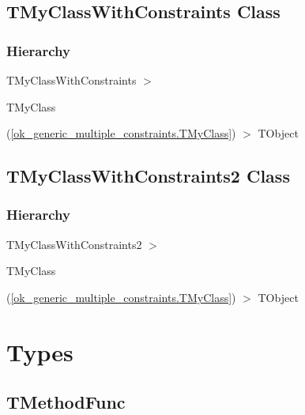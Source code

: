 \documentclass{report}
\newif\ifpdf
\begin{document}
\subsection*{TMyClassWithConstraints Class}
\fi
\label{ok_generic_multiple_constraints.TMyClassWithConstraints}
\subsubsection*{\large{\textbf{Hierarchy}}\normalsize\hspace{1ex}\hfill}
TMyClassWithConstraints {$>$} \begin{ttfamily}TMyClass\end{ttfamily}(\ref{ok_generic_multiple_constraints.TMyClass}) {$>$} 
TObject
\ifpdf
\subsection*{\large{\textbf{TMyClassWithConstraints2 Class}}\normalsize\hspace{1ex}\hrulefill}
\else
\subsection*{TMyClassWithConstraints2 Class}
\fi
\label{ok_generic_multiple_constraints.TMyClassWithConstraints2}
\subsubsection*{\large{\textbf{Hierarchy}}\normalsize\hspace{1ex}\hfill}
TMyClassWithConstraints2 {$>$} \begin{ttfamily}TMyClass\end{ttfamily}(\ref{ok_generic_multiple_constraints.TMyClass}) {$>$} 
TObject
\section{Types}
\ifpdf
\subsection*{\large{\textbf{TMethodFunc}}\normalsize\hspace{1ex}\hrulefill}
\else
\end{document}
